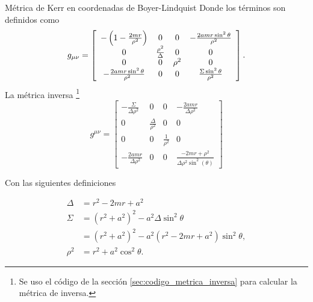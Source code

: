 \begin{definition}{Métrica de Kerr en coordenadas de Boyer-Lindquist}{}
    Donde los términos son definidos como
    \begin{equation}
        g_{\mu \nu}=\left[
            \begin{array}{cccc}
                -\left(1-\frac{2 mr}{\rho^2}\right) & 0                   & 0      & - \frac{2a  mr \sin^2\theta}{\rho^2} \\
                0                                 & \frac{\rho^2}{\Delta} & 0      & 0                                  \\
                0                                 & 0                   & \rho^2 & 0                                  \\
                -\frac{2a  mr \sin^2\theta}{\rho^2} & 0                   & 0      & \frac{\Sigma \sin^2\theta}{\rho^2}
            \end{array}
            \right].
        \label{eq:covariantKerrMetric}
    \end{equation}
    La métrica inversa \footnote{Se uso el código de la sección \ref{sec:codigo_metrica_inversa} para calcular la métrica de inversa. }
    \begin{equation}
        g^{\mu\nu}=\left[\begin{matrix}- \frac{\Sigma}{\Delta \rho^2} & 0 & 0 & - \frac{2 a m r}{\Delta \rho^2}\\0 & \frac{\Delta}{\rho^2} & 0 & 0\\0 & 0 & \frac{1}{\rho^2} & 0\\- \frac{2 a m r}{\Delta \rho^2} & 0 & 0 & \frac{- 2 m r + \rho^2}{\Delta \rho^2 \sin^{2}{\left(\theta \right)}}\end{matrix}\right]
        \label{eq:contravariantKerrMetric}
    \end{equation}

    Con las siguientes definiciones

    \begin{equation}
        \begin{aligned}
            \Delta & = r^2 - 2mr + a^2                                              \\
            \Sigma & = \left(r^2+a^2\right)^2-a^2 \Delta \sin ^2 \theta             \\
                   & =\left(r^2+a^2\right)^2-a^2 (r^2 - 2mr + a^2) \sin ^2 \theta , \\
            \rho^2 & = r^2+a^2 \cos ^2 \theta.
        \end{aligned}
    \end{equation}
\end{definition}

